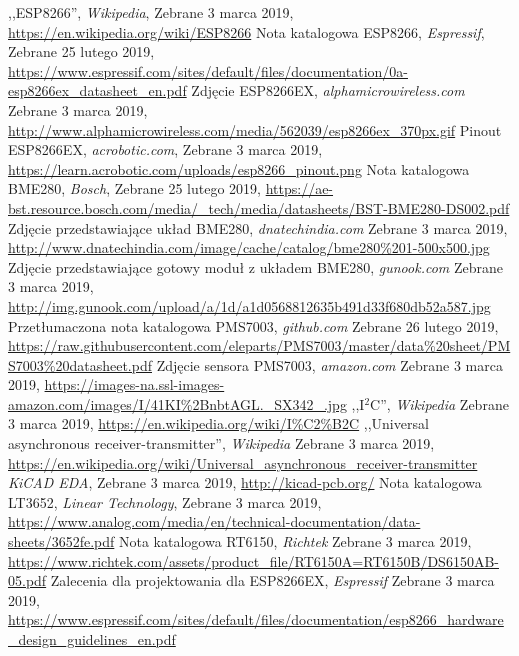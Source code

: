 \documentclass[12pt,a4paper,oneside]{memoir}
\begin{document}
\begin{thebibliography}{16}
	,,ESP8266'',
	\textit{Wikipedia},
	Zebrane 3 marca 2019,
	\url{https://en.wikipedia.org/wiki/ESP8266}
	Nota katalogowa ESP8266,
	\textit{Espressif},
	Zebrane 25 lutego 2019,
	\url{https://www.espressif.com/sites/default/files/documentation/0a-esp8266ex_datasheet_en.pdf}
	Zdjęcie ESP8266EX,
	\textit{alphamicrowireless.com}
	Zebrane 3 marca 2019,
	\url{http://www.alphamicrowireless.com/media/562039/esp8266ex_370px.gif}
	Pinout ESP8266EX,
	\textit{acrobotic.com},
	Zebrane 3 marca 2019,
	\url{https://learn.acrobotic.com/uploads/esp8266_pinout.png}
	Nota katalogowa BME280,
	\textit{Bosch},
	Zebrane 25 lutego 2019,
	\url{https://ae-bst.resource.bosch.com/media/_tech/media/datasheets/BST-BME280-DS002.pdf}
	Zdjęcie przedstawiające układ BME280,
	\textit{dnatechindia.com}
	Zebrane 3 marca 2019,
	\url{http://www.dnatechindia.com/image/cache/catalog/bme280\%201-500x500.jpg}
	Zdjęcie przedstawiające gotowy moduł z układem BME280,
	\textit{gunook.com}
	Zebrane 3 marca 2019,
	\url{http://img.gunook.com/upload/a/1d/a1d0568812635b491d33f680db52a587.jpg}
	Przetłumaczona nota katalogowa PMS7003,
	\textit{github.com}
	Zebrane 26 lutego 2019,
	\url{https://raw.githubusercontent.com/eleparts/PMS7003/master/data\%20sheet/PMS7003\%20datasheet.pdf}
	Zdjęcie sensora PMS7003,
	\textit{amazon.com}
	Zebrane 3 marca 2019,
	\url{https://images-na.ssl-images-amazon.com/images/I/41KI\%2BnbtAGL._SX342_.jpg}
	,,I$^2$C'',
	\textit{Wikipedia}
	Zebrane 3 marca 2019,
	\url{https://en.wikipedia.org/wiki/I%C2%B2C}
	,,Universal asynchronous receiver-transmitter'', 
	\textit{Wikipedia}
	Zebrane 3 marca 2019,
	\url{https://en.wikipedia.org/wiki/Universal_asynchronous_receiver-transmitter}	
	\textit{KiCAD EDA},
	Zebrane 3 marca 2019,
	\url{http://kicad-pcb.org/}
	Nota katalogowa LT3652,
	\textit{Linear Technology},
	Zebrane 3 marca 2019,
	\url{https://www.analog.com/media/en/technical-documentation/data-sheets/3652fe.pdf}
	Nota katalogowa RT6150,
	\textit{Richtek}
	Zebrane 3 marca 2019,
	\url{https://www.richtek.com/assets/product_file/RT6150A=RT6150B/DS6150AB-05.pdf}
	Zalecenia dla projektowania dla ESP8266EX,
	\textit{Espressif}
	Zebrane 3 marca 2019,
	\url{https://www.espressif.com/sites/default/files/documentation/esp8266_hardware_design_guidelines_en.pdf}
\end{thebibliography}
\end{document}
